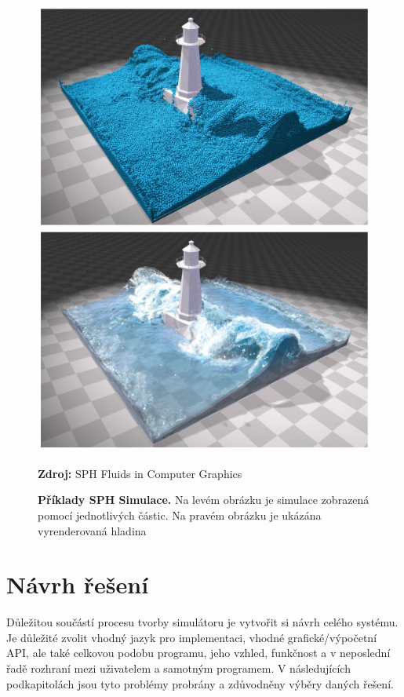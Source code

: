 \begin{figure}[h]\centering
	\centering
	\captionsetup{justification=centering}
	\includegraphics[width=0.5\linewidth]{obrazky-figures/SPHSim1_01.jpg}\hfill
	\includegraphics[width=0.5\linewidth]{obrazky-figures/SPHSim1_02.jpg}\hfill
	\caption{\textbf{Příklady SPH Simulace.} Na levém obrázku je simulace zobrazená pomocí jednotlivých částic. Na pravém obrázku je ukázána vyrenderovaná hladina}
	\textbf{Zdroj: } SPH Fluids in Computer Graphics \cite{Ihmsen14}
	\label{fig:SPHFigure}
\end{figure}

\chapter{Návrh řešení}
\label{chapter:navrh_resení}
Důležitou součástí procesu tvorby simulátoru je vytvořit si návrh celého systému. Je důležité zvolit vhodný jazyk pro implementaci, vhodné grafické/výpočetní API, ale také celkovou podobu programu, jeho vzhled, funkčnost a v neposlední řadě rozhraní mezi uživatelem a samotným programem. V následujících podkapitolách jsou tyto problémy probrány a zdůvodněny výběry daných řešení. 

